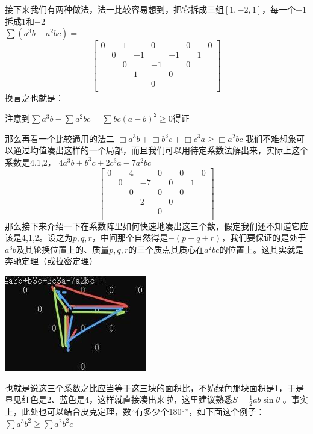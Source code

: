 \documentclass[UTF8]{ctexart}
\begin{document}
接下来我们有两种做法，法一比较容易想到，把它拆成三组$ [1,-2,1] $，每一个$ -1 $拆成$ 1 $和$ -2 $\\
$ \displaystyle \sum (a^{3} b-a^{2} b c)= $
\renewcommand*{\arraystretch}{1.732}\[\left[\begin{matrix}
	0& &1& &0& &0& &0\\
	&0& &-1& &-1& &1&\\
	& &0& &-1& &0& &\\
	& & &1& &0& & &\\
	& & & &0& & & &\\
\end{matrix}\right]\]
换言之也就是：\\
\begin{center}
	注意到$ \displaystyle \sum a^{3} b-\displaystyle \sum a^{2} b c=\displaystyle \sum b c(a-b)^{2} \geq 0 $得证
\end{center}
那么再看一个比较通用的法二
$ \Box a^{3} b+\Box b^{3} c+\Box c^{3} a \geq \Box a^{2} b c $
我们不难想象可以通过均值凑出这样的一个局部，而且我们可以用待定系数法解出来，实际上这个系数是4,1,2，
$ 4a^{3}b+b^{3}c+2c^{3}a-7a^{2}bc= $\\
\renewcommand*{\arraystretch}{1.732}\[\left[\begin{matrix}
	0& &4& &0& &0& &0\\
	& 0& &-7& &0& &1&\\
	& &0& &0& &0& &\\
	& & &2& &0& & &\\
	& & & &0& & & &\\
\end{matrix}\right]\]
那么接下来介绍一下在系数阵里如何快速地凑出这三个数，假定我们还不知道它应该是4,1,2。设之为$ p,q,r $，中间那个自然得是$ -(p+q+r) $，我们要保证的是处于$ a^{3}b $及其轮换位置上的、质量$ p,q,r $的三个质点其质心在$ a^{2}bc $的位置上。这其实就是奔驰定理（或拉密定理）

\begin{center}
	\includegraphics[width=0.4\linewidth]{130}
\end{center}

也就是说这三个系数之比应当等于这三块的面积比，不妨绿色那块面积是1，于是显见红色是2、蓝色是4，这样就直接凑出来啦，这里建议熟悉$ S=\displaystyle \frac{1}{2}ab  \sin \theta $
。事实上，此处也可以结合皮克定理，数“有多少个180°”，如下面这个例子：\\
$ \displaystyle  \sum a^{3} b^{2} \geq \displaystyle  \sum a^{2} b^{2} c $
\end{document}
